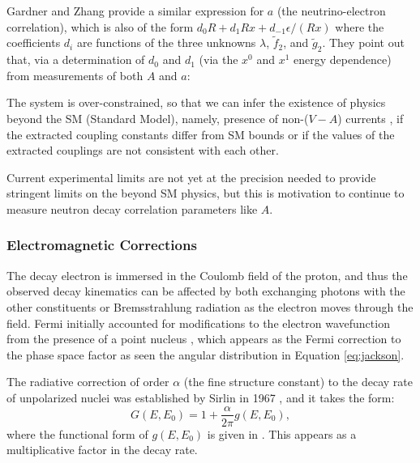 Gardner and Zhang provide a similar expression for $a$ (the neutrino-electron correlation),
which is also of the form $d_0R+d_1Rx+d_{-1}\epsilon/(Rx)$ where the coefficients $d_i$ are functions
of the three unknowns $\lambda$, $\tilde{f}_2$, and $\tilde{g}_2$.
They point out that, via a determination of $d_0$ and
$d_1$ (via the $x^0$ and $x^1$ energy dependence) from measurements of both $A$ and $a$:
%
\begin{displayquote}
  The system is over-constrained, so that we can infer the existence of physics
  beyond the SM (Standard Model), namely, presence of non-($V-A$) currents
  \cite{jackson1957a}, if the extracted coupling constants differ from SM bounds or if the
  values of the extracted couplings are not consistent with each other.
\end{displayquote}

Current experimental limits are not yet at the precision needed to provide stringent
limits on the beyond SM physics, but this is motivation to continue to measure
neutron decay correlation parameters like $A$.

\subsubsection{Electromagnetic Corrections} \label{sssec:RadCorr}

The decay electron is immersed in the Coulomb field of the proton, and thus the observed
decay kinematics can be affected by both exchanging photons with the other
constituents or Bremsstrahlung radiation as the electron moves through the field.
Fermi initially accounted for modifications to the electron wavefunction from the
presence of a point nucleus \cite{fermi1934versuch,wilkinson1982}, which appears
as the Fermi correction to the phase space factor as seen the
angular distribution in Equation \ref{eq:jackson}.

The radiative correction of order $\alpha$ (the fine structure constant) to the
decay rate of unpolarized nuclei was established
by Sirlin in 1967 \cite{sirlin1967}, and it takes the form:
%
\begin{equation}
  G(E,E_0) = 1+\frac{\alpha}{2\pi}g(E,E_0),
\end{equation}
where the functional form of $g(E,E_0)$ is given in \cite{sirlin1967}. This appears
as a multiplicative factor in the decay rate.

